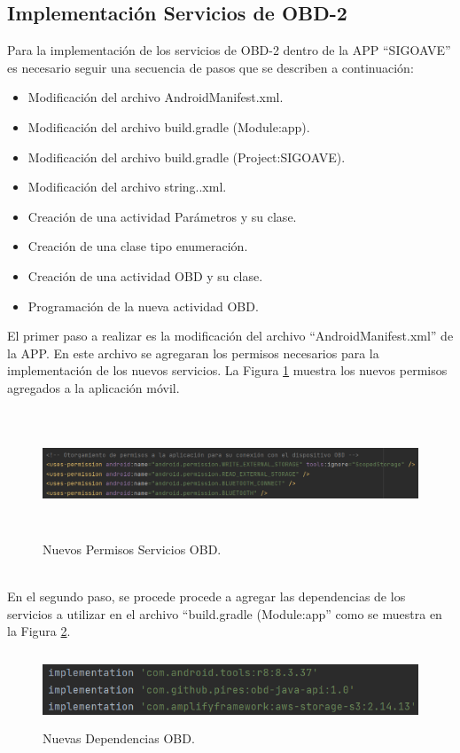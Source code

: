 \documentclass[a4paper,10pt, oneside, titlepage]{article}
\begin{document}
	\subsection{Implementación Servicios de OBD-2}\label{Etiqueta_Implementacion_Servicios_OBD-2}
	Para la implementación de los servicios de OBD-2 dentro de la APP ``SIGOAVE'' es necesario seguir una secuencia de pasos que se describen a continuación:
	\begin{itemize}
		\item Modificación del archivo AndroidManifest.xml.
		\item Modificación del archivo build.gradle (Module:app).
		\item Modificación del archivo build.gradle (Project:SIGOAVE).
		\item Modificación del archivo string..xml.
		\item Creación de una actividad Parámetros y su clase.
		\item Creación de una clase tipo enumeración.
		\item Creación de una actividad OBD y su clase.
		\item Programación de la nueva actividad OBD.
	\end{itemize}
	\indent\newline\indent El primer paso a realizar es la modificación del archivo ``AndroidManifest.xml'' de la APP. En este archivo se agregaran los permisos necesarios para la implementación de los nuevos servicios. La Figura \ref{Permisos_APP_OBD} muestra los nuevos permisos agregados a la aplicación móvil.
	\begin{figure}[!h]
		\centering
		\includegraphics[width = 1\linewidth, height = 3.8cm]{Permisos_APP_OBD.png}
		\caption{Nuevos Permisos Servicios OBD.}
		\label{Permisos_APP_OBD}
	\end{figure} \\
	\indent En el segundo paso, se procede procede a agregar las dependencias de los servicios a utilizar en el archivo ``build.gradle (Module:app'' como se muestra en la Figura \ref{Nuevas_Dependencias_OBD}.
	\begin{figure}[!h]
		\centering
		\includegraphics[width = 1\linewidth, height = 2.2cm]{Nuevas_Dependencias_OBD.png}
		\caption{Nuevas Dependencias OBD.}
		\label{Nuevas_Dependencias_OBD}
	\end{figure} \\
\end{document}
